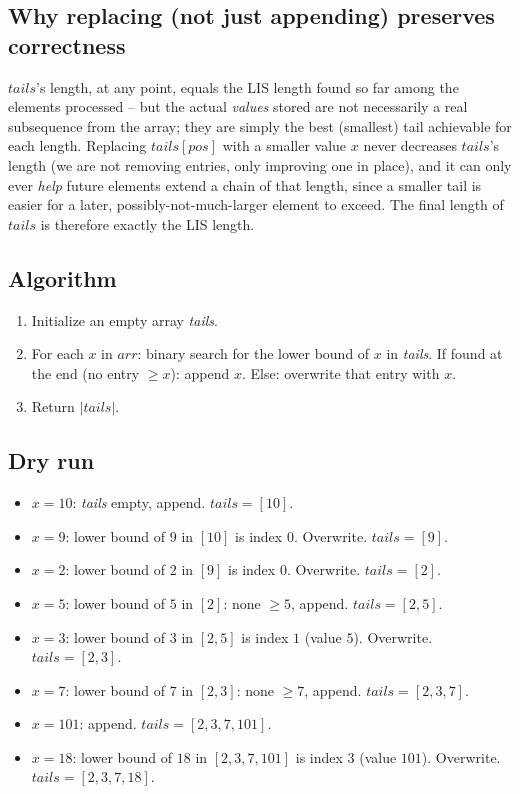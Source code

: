 \subsection*{Why replacing (not just appending) preserves correctness}

$\textit{tails}$'s length, at any point, equals the LIS length found so
far among the elements processed -- but the actual \emph{values} stored
are not necessarily a real subsequence from the array; they are simply
the best (smallest) tail achievable for each length. Replacing
$\textit{tails}[\textit{pos}]$ with a smaller value $x$ never decreases
$\textit{tails}$'s length (we are not removing entries, only improving
one in place), and it can only ever \emph{help} future elements extend a
chain of that length, since a smaller tail is easier for a later,
possibly-not-much-larger element to exceed. The final length of
$\textit{tails}$ is therefore exactly the LIS length.

\subsection*{Algorithm}

\begin{enumerate}
  \item Initialize an empty array \textit{tails}.
  \item For each $x$ in $\textit{arr}$: binary search for the lower
        bound of $x$ in \textit{tails}. If found at the end (no entry
        $\ge x$): append $x$. Else: overwrite that entry with $x$.
  \item Return $|\textit{tails}|$.
\end{enumerate}

\subsection*{Dry run}


\begin{itemize}
  \item $x=10$: \textit{tails} empty, append. $\textit{tails}=[10]$.
  \item $x=9$: lower bound of $9$ in $[10]$ is index $0$. Overwrite.
        $\textit{tails}=[9]$.
  \item $x=2$: lower bound of $2$ in $[9]$ is index $0$. Overwrite.
        $\textit{tails}=[2]$.
  \item $x=5$: lower bound of $5$ in $[2]$: none $\ge5$, append.
        $\textit{tails}=[2,5]$.
  \item $x=3$: lower bound of $3$ in $[2,5]$ is index $1$ (value $5$).
        Overwrite. $\textit{tails}=[2,3]$.
  \item $x=7$: lower bound of $7$ in $[2,3]$: none $\ge7$, append.
        $\textit{tails}=[2,3,7]$.
  \item $x=101$: append. $\textit{tails}=[2,3,7,101]$.
  \item $x=18$: lower bound of $18$ in $[2,3,7,101]$ is index $3$
        (value $101$). Overwrite. $\textit{tails}=[2,3,7,18]$.
\end{itemize}

